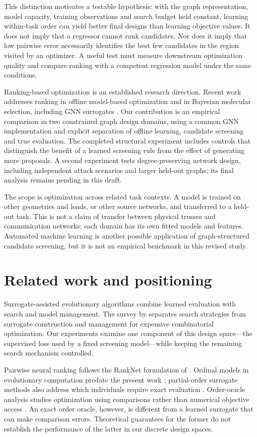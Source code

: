 \documentclass[11pt,a4paper]{article}
\begin{document}
This distinction motivates a testable hypothesis: with the graph representation, model capacity, training observations and search budget held constant, learning within-task order can yield better final designs than learning objective values. It does not imply that a regressor cannot rank candidates. Nor does it imply that low pairwise error necessarily identifies the best few candidates in the region visited by an optimizer. A useful test must measure downstream optimization quality and compare ranking with a competent regression model under the same conditions.

Ranking-based optimization is an established research direction. Recent work addresses ranking in offline model-based optimization and in Bayesian molecular selection, including GNN surrogates \citep{tan2025,tom2025}. Our contribution is an empirical comparison in two constrained graph design domains, using a common GNN implementation and explicit separation of offline learning, candidate screening and true evaluation. The completed structural experiment includes controls that distinguish the benefit of a learned screening rule from the effect of generating more proposals. A second experiment tests degree-preserving network design, including independent attack scenarios and larger held-out graphs; its final analysis remains pending in this draft.

The scope is optimization across related task contexts. A model is trained on other geometries and loads, or other source networks, and transferred to a held-out task. This is not a claim of transfer between physical trusses and communication networks: each domain has its own fitted models and features. Automated machine learning is another possible application of graph-structured candidate screening, but it is not an empirical benchmark in this revised study.

\section{Related work and positioning}
Surrogate-assisted evolutionary algorithms combine learned evaluation with search and model management. The survey by \citet{liu2024} separates search strategies from surrogate construction and management for expensive combinatorial optimization. Our experiments examine one component of this design space---the supervised loss used by a fixed screening model---while keeping the remaining search mechanism controlled.

Pairwise neural ranking follows the RankNet formulation of \citet{burges2005}. Ordinal models in evolutionary computation predate the present work \citep{runarsson2006}; partial-order surrogate methods also address which individuals require exact evaluation \citep{volz2016}. Order-oracle analysis studies optimization using comparisons rather than numerical objective access \citep{lobanov2024}. An exact order oracle, however, is different from a learned surrogate that can make comparison errors. Theoretical guarantees for the former do not establish the performance of the latter in our discrete design spaces.
\end{document}
